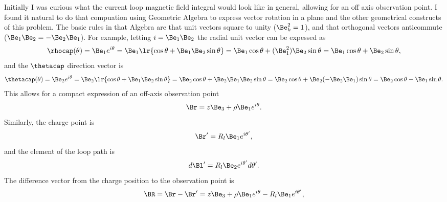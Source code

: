 %
%
%
Initially I was curious what the current loop magnetic field integral would look like in general, allowing for an off axis observation point.
%
I found it natural to do that compuation using Geometric Algebra to express vector rotation in a plane and the other geometrical constructs of this problem.  The basic rules in that Algebra are that unit vectors square to unity (\(\Be_k^2 = 1 \)), and that orthogonal vectors anticommute (\( \Be_1 \Be_2 = -\Be_2 \Be_1 \)).  For example, letting \( i = \Be_1 \Be_2 \) the radial unit vector can be expessed as
%
\begin{dmath}\label{eqn:emtProblemSet3Problem2:160}
\rhocap(\theta)
=
\Be_1 e^{i \theta}
= \Be_1 \lr{ \cos\theta + \Be_1 \Be_2 \sin\theta }
= \Be_1 \cos\theta + (\Be_1^2) \Be_2 \sin\theta
= \Be_1 \cos\theta + \Be_2 \sin\theta,
\end{dmath}
%
and the \( \thetacap \) direction vector is
\begin{dmath}\label{eqn:emtProblemSet3Appendix:240}
\thetacap(\theta)
=
\Be_2 e^{i \theta}
= \Be_2 \lr{ \cos\theta + \Be_1 \Be_2 \sin\theta }
= \Be_2 \cos\theta + \Be_2 \Be_1 \Be_2 \sin\theta
= \Be_2 \cos\theta + \Be_2 (-\Be_2 \Be_1) \sin\theta
= \Be_2 \cos\theta - \Be_1 \sin\theta.
\end{dmath}
%
This allows for a compact expression of an off-axis observation point
%
\begin{dmath}\label{eqn:emtProblemSet3Problem2:60}
\Br = z \Be_3 + \rho \Be_1 e^{i\theta}.
\end{dmath}
%
Similarly, the charge point is
\begin{dmath}\label{eqn:emtProblemSet3Problem2:80}
\Br' = R_l \Be_1 e^{i \theta'},
\end{dmath}
%
and the element of the loop path is
\begin{dmath}\label{eqn:emtProblemSet3Problem2:100}
d\Bl' = R_l \Be_2 e^{i\theta'} d\theta'.
\end{dmath}
%
The difference vector from the charge position to the observation point is
%
\begin{dmath}\label{eqn:emtProblemSet3Problem2:120}
\BR
= \Br - \Br'
=
z \Be_3 + \rho \Be_1 e^{i\theta}
-
R_l \Be_1 e^{i \theta'},
\end{dmath}
